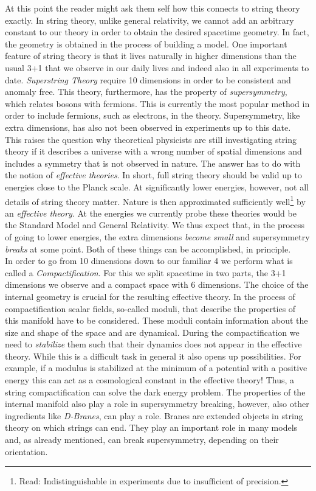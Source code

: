 \documentclass[12pt]{report}
\begin{document}
At this point the reader might ask them self how this connects to string theory exactly. In string theory, unlike general relativity, we cannot add an arbitrary constant to our theory in order to obtain the desired spacetime geometry. In fact, the geometry is obtained in the process of building a model. One important feature of string theory is that it lives naturally in higher dimensions than the usual 3+1 that we observe in our daily lives and indeed also in all experiments to date. \emph{Superstring Theory} require 10 dimensions in order to be consistent and anomaly free. This theory, furthermore, has the property of \emph{supersymmetry}, which relates bosons with fermions. This is currently the most popular method in order to include fermions, such as electrons, in the theory. Supersymmetry, like extra dimensions, has also not been observed in experiments up to this date.\\
This raises the question why theoretical physicists are still investigating string theory if it describes a universe with a wrong number of spatial dimensions and includes a symmetry that is not observed in nature. The answer has to do with the notion of \emph{effective theories}. In short, full string theory should be valid up to energies close to the Planck scale. At significantly lower energies, however, not all details of string theory matter. Nature is then approximated sufficiently well\footnote{Read: Indistinguishable in experiments due to insufficient of precision.} by an \emph{effective theory}. At the energies we currently probe these theories would be the Standard Model and General Relativity. We thus expect that, in the process of going to lower energies, the extra dimensions \emph{become small} and supersymmetry \emph{breaks} at some point. Both of these things can be accomplished, in principle.\\
In order to go from 10 dimensions down to our familiar 4 we perform what is called a \emph{Compactification}. For this we split spacetime in two parts, the 3+1 dimensions we observe and a compact space with 6 dimensions. The choice of the internal geometry is crucial for the resulting effective theory. In the process of compactification scalar fields, so-called moduli, that describe the properties of this manifold have to be considered. These moduli contain information about the size and shape of the space and are dynamical. During the compactification we need to \emph{stabilize} them such that their dynamics does not appear in the effective theory. While this is a difficult task in general it also opens up possibilities. For example, if a modulus is stabilized at the minimum of a potential with a positive energy this can act as a cosmological constant in the effective theory! Thus, a string compactification can solve the dark energy problem. The properties of the internal manifold also play a role in supersymmetry breaking, however, also other ingredients like \emph{D-Branes}, can play a role. Branes are extended objects in string theory on which strings can end. They play an important role in many models and, as already mentioned, can break supersymmetry, depending on their orientation.\\
\end{document}
